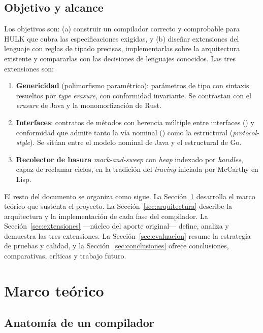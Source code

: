 \documentclass[14pts,runningheads,a4paper]{llncs}
\newcommand{\code}[1]{\texttt{\detokenize{#1}}}
\begin{document}
\subsection{Objetivo y alcance}
 Los objetivos son:
(a) construir un compilador correcto y comprobable para HULK que cubra las especificaciones exigidas, y (b) dise\~nar extensiones del lenguaje con reglas de tipado precisas,
implementarlas sobre la arquitectura existente y compararlas con las decisiones de
lenguajes conocidos. 
Las tres extensiones son:

\begin{enumerate}
  \item \textbf{Genericidad} (polimorfismo param\'etrico): par\'ametros de tipo con
        sintaxis \code{[T]} resueltos por \emph{type erasure}, con conformidad
        invariante. Se contrastan con el \emph{erasure} de Java y la
        monomorfizaci\'on de Rust.
  \item \textbf{Interfaces}: contratos de m\'etodos con herencia m\'ultiple entre
        interfaces (\code{extends}) y conformidad que admite tanto la v\'ia nominal
        (\code{implements}) como la estructural (\emph{protocol-style}). Se sit\'uan
        entre el modelo nominal de Java y el estructural de Go.
  \item \textbf{Recolector de basura} \emph{mark-and-sweep} con \emph{heap}
        indexado por \emph{handles}, capaz de reclamar ciclos, en la tradici\'on
        del \emph{tracing} iniciada por McCarthy en Lisp.
\end{enumerate}

\noindent
El resto del documento se organiza como sigue. La Secci\'on~\ref{sec:marco}
desarrolla el marco te\'orico que sustenta el proyecto. La
Secci\'on~\ref{sec:arquitectura} describe la arquitectura y la implementaci\'on de
cada fase del compilador. La Secci\'on~\ref{sec:extensiones} ---n\'ucleo del aporte
original--- define, analiza y demuestra las tres extensiones. La
Secci\'on~\ref{sec:evaluacion} resume la estrategia de pruebas y calidad, y la
Secci\'on~\ref{sec:conclusiones} ofrece conclusiones, comparativas, cr\'iticas y
trabajo futuro.

\section{Marco te\'orico}\label{sec:marco}

\subsection{Anatom\'ia de un compilador}
\end{document}

